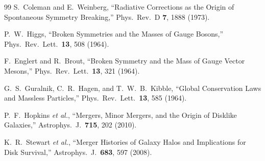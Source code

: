 \begin{thebibliography}{99}
S.~Coleman and E.~Weinberg,
``Radiative Corrections as the Origin of Spontaneous Symmetry Breaking,''
Phys.\ Rev.\ D \textbf{7}, 1888 (1973).

P.~W.~Higgs,
``Broken Symmetries and the Masses of Gauge Bosons,''
Phys.\ Rev.\ Lett.\ \textbf{13}, 508 (1964).

F.~Englert and R.~Brout,
``Broken Symmetry and the Mass of Gauge Vector Mesons,''
Phys.\ Rev.\ Lett.\ \textbf{13}, 321 (1964).

G.~S.~Guralnik, C.~R.~Hagen, and T.~W.~B.~Kibble,
``Global Conservation Laws and Massless Particles,''
Phys.\ Rev.\ Lett.\ \textbf{13}, 585 (1964).

P.~F.~Hopkins \textit{et al.},
``Mergers, Minor Mergers, and the Origin of Disklike Galaxies,''
Astrophys.\ J.\ \textbf{715}, 202 (2010).

K.~R.~Stewart \textit{et al.},
``Merger Histories of Galaxy Halos and Implications for Disk Survival,''
Astrophys.\ J.\ \textbf{683}, 597 (2008).

\end{thebibliography}
